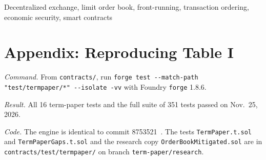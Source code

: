 \documentclass[conference]{IEEEtran}
\begin{document}
\begin{IEEEkeywords}
Decentralized exchange, limit order book, front-running, transaction ordering, economic security, smart contracts
\end{IEEEkeywords}











\section*{Appendix: Reproducing Table I}
{\footnotesize\raggedright
\noindent\textit{Command.} From \texttt{contracts/}, run \texttt{forge test -{}-match-path "test/termpaper/*" -{}-isolate -vv} with Foundry \texttt{forge} 1.8.6.\par %
\noindent\textit{Result.} All 16 term-paper tests and the full suite of 351 tests passed on Nov.~25, 2026.\par %
\noindent\textit{Code.} The engine is identical to commit 8753521~\cite{repo8753521}. The tests \texttt{TermPaper.t.sol} and \texttt{TermPaperGaps.t.sol} and the research copy \texttt{OrderBookMitigated.sol} are in \texttt{contracts/test/termpaper/} on branch \texttt{term-paper/research}. %
\par}
\end{document}

